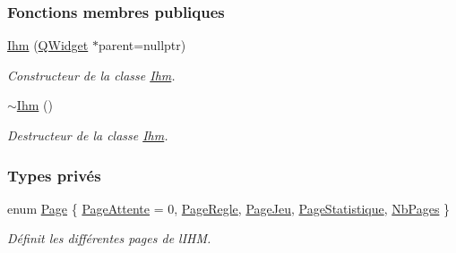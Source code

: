 \subsubsection*{Fonctions membres publiques}
\begin{DoxyCompactItemize}
\item 
\hyperlink{class_ihm_a50a7a15775452923868348bdbe4fa51e}{Ihm} (\hyperlink{class_q_widget}{Q\+Widget} $\ast$parent=nullptr)
\begin{DoxyCompactList}\small\item\em Constructeur de la classe \hyperlink{class_ihm}{Ihm}. \end{DoxyCompactList}\item 
\hyperlink{class_ihm_add292ea9005bacd1de44dd1ed9ede5b9}{$\sim$\+Ihm} ()
\begin{DoxyCompactList}\small\item\em Destructeur de la classe \hyperlink{class_ihm}{Ihm}. \end{DoxyCompactList}\end{DoxyCompactItemize}
\subsubsection*{Types privés}
\begin{DoxyCompactItemize}
\item 
enum \hyperlink{class_ihm_a472c7a7bec7e6e0230842f78ace4833e}{Page} \{ \newline
\hyperlink{class_ihm_a472c7a7bec7e6e0230842f78ace4833ea6c6994098bc403f5ec5f712c347ce622}{Page\+Attente} = 0, 
\hyperlink{class_ihm_a472c7a7bec7e6e0230842f78ace4833eaeb2ec486b2e880de96d76609d12c36af}{Page\+Regle}, 
\hyperlink{class_ihm_a472c7a7bec7e6e0230842f78ace4833eadc27359267c694f4d9c3afc23fe8b82f}{Page\+Jeu}, 
\hyperlink{class_ihm_a472c7a7bec7e6e0230842f78ace4833eaacc428ff827bccfb5e8bdb4634457f10}{Page\+Statistique}, 
\newline
\hyperlink{class_ihm_a472c7a7bec7e6e0230842f78ace4833ea9eb2cac6f79bce4cfd72383724004949}{Nb\+Pages}
 \}\begin{DoxyCompactList}\small\item\em Définit les différentes pages de l\textquotesingle{}I\+HM. \end{DoxyCompactList}
\end{DoxyCompactItemize}
